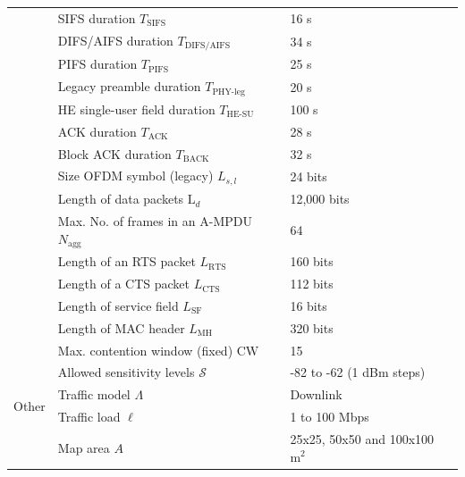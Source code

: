 \documentclass[conference]{IEEEtran}
\begin{document}
\begin{table}[h]
{\begin{tabular}{c|l|l|}
				\cline{2-3} 
				\multicolumn{1}{|c|}{} & SIFS duration $T_\text{SIFS}$ & 16 \textmu s  \\
				\cline{2-3} 
				\multicolumn{1}{|c|}{} & DIFS/AIFS duration $T_\text{DIFS/AIFS}$ & 34 \textmu s \\
				\cline{2-3} 
				\multicolumn{1}{|c|}{} & PIFS duration $T_\text{PIFS}$ & 25 \textmu s \\
				\cline{2-3} 
				\multicolumn{1}{|c|}{} & Legacy preamble duration $T_\text{PHY-leg}$ & 20 \textmu s  \\
				\cline{2-3}
				\multicolumn{1}{|c|}{} & HE single-user field duration $T_\text{HE-SU}$ & 100 \textmu s \\
				\cline{2-3} 
				\multicolumn{1}{|c|}{} & ACK duration $T_\text{ACK}$ & 28 \textmu s\\
				\cline{2-3} 
				\multicolumn{1}{|c|}{} & Block ACK duration $T_\text{BACK}$ & 32 \textmu s \\
				\cline{2-3} 
				\multicolumn{1}{|c|}{} & Size OFDM symbol (legacy) $L_{s,l}$ & 24 bits \\
				\cline{2-3} 
				\multicolumn{1}{|c|}{} & Length of data packets $\text{L}_{d}$ & 12,000 bits \\
				\cline{2-3} 
				\multicolumn{1}{|c|}{} & Max. No. of frames in an A-MPDU $N_{\text{agg}}$ & 64 \\
				\cline{2-3} 
				\multicolumn{1}{|c|}{} & Length of an RTS packet $L_\text{RTS}$  & 160 bits \\
				\cline{2-3} 
				\multicolumn{1}{|c|}{} & Length of a CTS packet $L_\text{CTS}$ & 112 bits \\
				\cline{2-3} 
				\multicolumn{1}{|c|}{} & Length of service field $L_\text{SF}$ & 16 bits  \\
				\cline{2-3} 
				\multicolumn{1}{|c|}{} & Length of MAC header $L_\text{MH}$ & 320 bits \\
				\cline{2-3} 
				\multicolumn{1}{|c|}{} & Max. contention window (fixed) $\text{CW}$ & 15 \\
				\cline{2-3} 
				\multicolumn{1}{|c|}{} & Allowed sensitivity levels $\mathcal{S}$ & -82 to -62 (1 dBm steps) \\
				\hline
				\multicolumn{1}{|c|}{\multirow{2}{*}{Other}} & Traffic model $\Lambda$ & Downlink\\
				\cline{2-3} 
				\multicolumn{1}{|c|}{} & Traffic load $\ell$ & 1 to 100 Mbps\\ 
				\cline{2-3} 
				\multicolumn{1}{|c|}{} & Map area $A$ & 25x25, 50x50 and 100x100 $\text{m}^2$\\
				\hline
		\end{tabular}}
		\label{table:parameters}
	\end{table}
	
\end{document}
